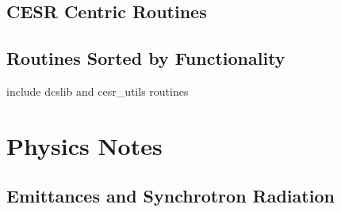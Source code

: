 \documentclass{book}
\begin{document}
\chapter{CESR Centric Routines}

\chapter{Routines Sorted by Functionality}

include dcslib and cesr\_utils routines

\part{Physics Notes}

\chapter{Emittances and Synchrotron Radiation}



\begin{theindex}


\end{theindex}
\end{document}
